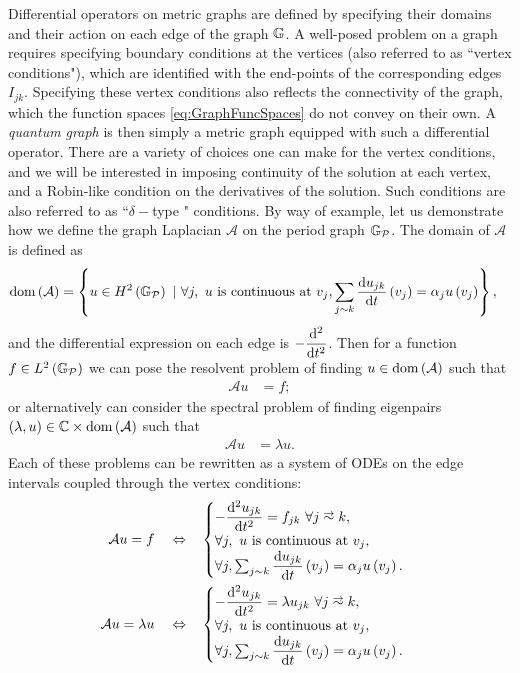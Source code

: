 Differential operators on metric graphs are defined by specifying their domains and their action on each edge of the graph $\mathbb{G}$.
A well-posed problem on a graph requires specifying boundary conditions at the vertices (also referred to as ``vertex conditions"), which are identified with the end-points of the corresponding edges $I_{jk}$.
Specifying these vertex conditions also reflects the connectivity of the graph, which the function spaces \eqref{eq:GraphFuncSpaces} do not convey on their own.
A \emph{quantum graph} is then simply a metric graph equipped with such a differential operator.
There are a variety of choices one can make for the vertex conditions, and we will be interested in imposing continuity of the solution at each vertex, and a Robin-like condition on the derivatives of the solution.
Such conditions are also referred to as ``$\delta-$type " conditions. 
By way of example, let us demonstrate how we define the graph Laplacian $\mathcal{A}$ on the period graph $\mathbb{G}_{\mathcal{P}}$.
The domain of $\mathcal{A}$ is defined as
\begin{align*}
	\mathrm{dom}\left( \mathcal{A} \right) &= \left\{  u\in H^2\left( \mathbb{G}_{\mathcal{P}} \right) \ \vert \ \forall j, \ u \text{ is continuous at } v_j, \sum_{j\sim k}\dfrac{\mathrm{d}u_{jk}}{\mathrm{d}t}\left( v_j \right) = \alpha_j u\left( v_j \right)  \right\},
\end{align*}
and the differential expression on each edge is $-\dfrac{\mathrm{d}^2 }{\mathrm{d} {t}^2}$.
Then for a function $f\in L^2\left( \mathbb{G}_{\mathcal{P}} \right)$ we can pose the resolvent problem of finding $u\in\mathrm{dom}\left( \mathcal{A} \right)$ such that
\begin{align*}
	\mathcal{A}u &= f;
\end{align*}
or alternatively can consider the spectral problem of finding eigenpairs $\left( \lambda,u \right)\in\mathbb{C}\times\mathrm{dom}\left( \mathcal{A} \right)$ such that
\begin{align*}
	\mathcal{A}u &= \lambda u.
\end{align*}
Each of these problems can be rewritten as a system of ODEs on the edge intervals coupled through the vertex conditions:
\begin{align*}
	\mathcal{A}u = f \quad\Leftrightarrow\quad &
	\begin{cases}
		-\ddiff{u_{jk}}{t} = f_{jk} \ \forall j\conLeft k, \\
		\forall j, \ u \text{ is continuous at } v_j, \\
		\forall j, \sum_{j\con k}\diff{u_{jk}}{t}\bracs{v_j} = \alpha_j u\bracs{v_j}.
	\end{cases} \\
	\mathcal{A}u = \lambda u \quad\Leftrightarrow\quad &
	\begin{cases}
		-\ddiff{u_{jk}}{t} = \lambda u_{jk} \ \forall j\conLeft k, \\
		\forall j, \ u \text{ is continuous at } v_j, \\
		\forall j, \sum_{j\con k}\diff{u_{jk}}{t}\bracs{v_j} = \alpha_j u\bracs{v_j}.
	\end{cases}
\end{align*}

